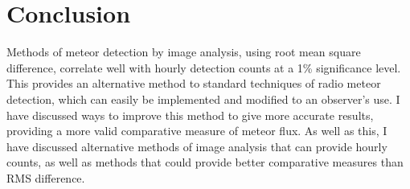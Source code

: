 \section{Conclusion}
Methods of meteor detection by image analysis, using root mean square difference, correlate well with hourly detection counts at a 1\% significance level. This provides an alternative method to standard techniques of radio meteor detection, which can easily be implemented and modified to an observer's use. I have discussed ways to improve this method to give more accurate results, providing a more valid comparative measure of meteor flux. As well as this, I have discussed alternative methods of image analysis that can provide hourly counts, as well as methods that could provide better comparative measures than RMS difference.